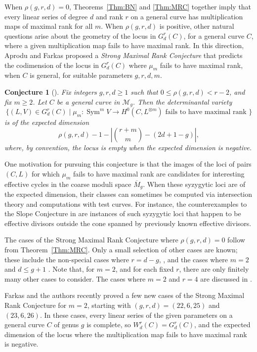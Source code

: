 \documentclass{amsart}
\newtheorem{conjecture}[theorem]{Conjecture}
\theoremstyle{definition}
\newcommand{\M}{\overline{M}}
\newcommand{\Sym}{\operatorname{Sym}}
\begin{document}
When $\rho(g,r,d) = 0$, Theorems~\ref{Thm:BN} and \ref{Thm:MRC} together imply that every linear series of degree $d$ and rank $r$ on a general curve has multiplication maps of maximal rank for all $m$.  When $\rho(g,r,d)$ is positive, other natural questions arise about the geometry of the locus in $G^r_d(C)$, for a general curve $C$, where a given multiplication map fails to have maximal rank. In this direction, Aprodu and Farkas proposed a \emph{Strong Maximal Rank Conjecture} that predicts the codimension of the locus in $G^r_d(C)$ where $\mu_m$ fails to have maximal rank, when $C$ is general, for suitable parameters $g,r,d,m$.

\begin{conjecture} [\cite{AproduFarkas11}]
Fix integers $g,r,d \geq 1$ such that $0 \leq \rho(g,r,d) < r-2$, and fix $m \geq 2$.  Let $C$ be a general curve in $\mathcal{M}_g$.  Then the determinantal variety 
\[
\{ (L,V) \in G^r_d(C) \mid \mu_m \colon \Sym^m V \to H^0(C, L^{\otimes m}) \text{  fails to have maximal rank } \}
\]
is of the expected dimension
\[
\rho(g,r,d) - 1 - \left|{r+m \choose m} - (2d+1-g) \right|,
\]
where, by convention, the locus is empty when the expected dimension is negative.
\end{conjecture}

One motivation for pursuing this conjecture is that the images of the loci of pairs $(C,L)$ for which $\mu_m$ fails to have maximal rank are candidates for interesting effective cycles in the coarse moduli space $\M_g$. When these syzygytic loci are of the expected dimension, their classes can sometimes be computed via intersection theory and computations with test curves. For instance, the counterexamples to the Slope Conjecture in \cite{FarkasPopa05, Farkas09b} are instances of such syzygytic loci that happen to be effective divisors outside the cone spanned by previously known effective divisors.

The cases of the Strong Maximal Rank Conjecture where $\rho(g,r,d) = 0$ follow from Theorem~\ref{Thm:MRC}. Only a small selection of other cases are known; these include the non-special cases where $r = d-g$, \cite[Proposition~5.7]{AproduFarkas11}, and the cases where $m = 2$ and $d  \leq g+1$ \cite{TiB03}.   Note that, for $m = 2$, and for each fixed $r$, there are only finitely many other cases to consider. The cases where $m=2$ and $r=4$ are discussed in \cite[Remark~5.6]{AproduFarkas11}. 

Farkas and the authors recently proved a few new cases of the Strong Maximal Rank Conjecture for $m = 2$, starting with $(g,r,d) = (22,6,25)$ and $(23,6,26)$. In these cases, every linear series of the given parameters on a general curve $C$ of genus $g$ is complete, so $W^r_d(C) = G^r_d(C)$, and the expected dimension of the locus where the multiplication map fails to have maximal rank is negative.
\end{document}
